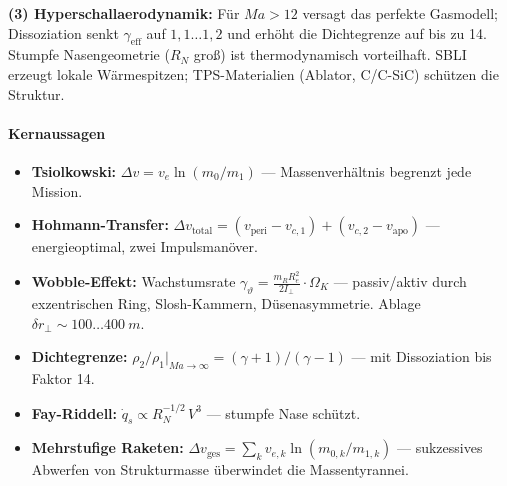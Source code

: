 ﻿\documentclass[12pt,a4paper]{article}
\newcommand{\Dv}{\Delta v}
\newcommand{\Ma}{M\!a}
\begin{document}
\textbf{(3) Hyperschallaerodynamik:} Für $\Ma > 12$ versagt das perfekte Gasmodell;
Dissoziation senkt $\gamma_{\mathrm{eff}}$ auf $1{,}1\ldots1{,}2$ und erhöht die
Dichtegrenze auf bis zu 14. Stumpfe Nasengeometrie ($R_N$ groß) ist thermodynamisch
vorteilhaft. SBLI erzeugt lokale Wärmespitzen; TPS-Materialien (Ablator, C/C-SiC)
schützen die Struktur.

\bigskip
\paragraph*{Kernaussagen}
\begin{itemize}[leftmargin=*]
  \item \textbf{Tsiolkowski:}
    $\Dv = v_e\ln(m_0/m_1)$ --- Massenverhältnis begrenzt jede Mission.
  \item \textbf{Hohmann-Transfer:}
    $\Dv_{\mathrm{total}} = (v_{\mathrm{peri}}-v_{c,1}) + (v_{c,2}-v_{\mathrm{apo}})$
    --- energieoptimal, zwei Impulsmanöver.
  \item \textbf{Wobble-Effekt:}
    Wachstumsrate
    $\gamma_\vartheta = \tfrac{m_R R_e^2}{2I_\perp}\cdot\Omega_K$ ---
    passiv/aktiv durch exzentrischen Ring, Slosh-Kammern, Düsenasymmetrie.
    Ablage $\delta r_\perp \sim 100\ldots\SI{400}{m}$.
  \item \textbf{Dichtegrenze:}
    $\rho_2/\rho_1|_{\Ma\to\infty} = (\gamma+1)/(\gamma-1)$ ---
    mit Dissoziation bis Faktor 14.
  \item \textbf{Fay-Riddell:}
    $\dot{q}_s \propto R_N^{-1/2}\,V^3$ --- stumpfe Nase schützt.
  \item \textbf{Mehrstufige Raketen:}
    $\Dv_{\mathrm{ges}} = \sum_k v_{e,k}\ln(m_{0,k}/m_{1,k})$ ---
    sukzessives Abwerfen von Strukturmasse überwindet die Massentyrannei.
\end{itemize}
\end{document}

